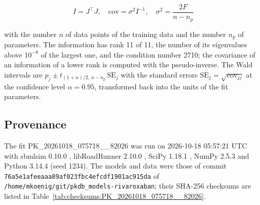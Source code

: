 \begin{equation}
I = J^\top J, \quad \mathrm{cov} = \sigma^2 I^{-1}, \quad \sigma^2 = \frac{2 F}{n - n_p}
\end{equation}

with the number $n$ of data points of the training data and the number $n_p$ of parameters. The information has rank 11 of 11, the number of its eigenvalues above $10^{-8}$ of the largest one, and the condition number 2710; the covariance of an information of a lower rank is computed with the pseudo-inverse. The Wald intervals are $\hat{p}_j \pm t_{(1+\alpha)/2,\, n-n_p}\, \mathrm{SE}_j$ with the standard errors $\mathrm{SE}_j = \sqrt{\mathrm{cov}_{jj}}$ at the confidence level $\alpha = 0.95$, transformed back into the units of the fit parameters.

\subsection{Provenance}

The fit PK\_20261018\_075718\_\_82026 was run on 2026-10-18 05:57:21 UTC with sbmlsim 0.10.0 \cite{Koenig2026_sbmlsim}, libRoadRunner 2.10.0 \cite{Welsh2023}, SciPy 1.18.1 \cite{Virtanen2020}, NumPy 2.5.3 \cite{Harris2020} and Python 3.14.4 (seed 1234). The models and data were those of commit \texttt{76a5e1afeeaaa89af023fbc4efcdf1901ac915da} of \texttt{/home/mkoenig/git/pkdb\_models-rivaroxaban}; their SHA-256 checksums are listed in Table~\ref{tab:checksums:PK_20261018_075718__82026}.

